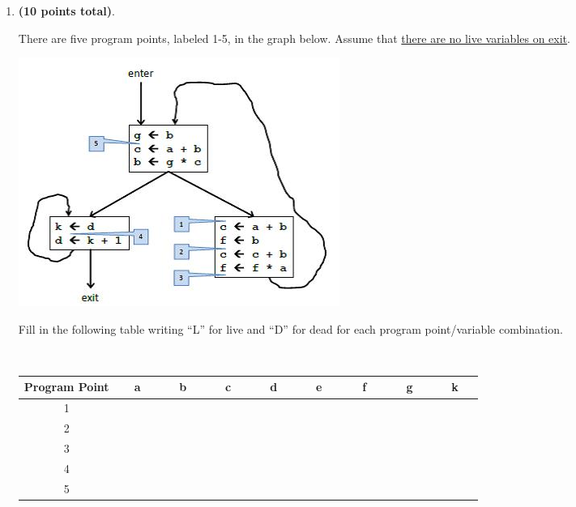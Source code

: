 \documentclass[11pt]{article} %
\begin{document}
\begin{enumerate}
\newpage







\item {\bf{(10 points total)}}.

There are five program points, labeled 1-5, in the graph below. Assume that \underline{there are no live 
variables on exit}. 

\begin{center}
\begin{minipage}{4in}
\includegraphics[]{LivenessFigure}
\end{minipage}
\end{center}


\noindent Fill in the following table writing “L” for live and “D” for dead for each program 
point/variable combination.
\newline

~~~~~~~~~~~~~~~~~~
\begin{tabular}{|c|c|c|c|c|c|c|c|c|}
\hline
Program Point & a & b & c & d & e & f & g & k
\\ \hline
1 &~~~~~~&~~~~~~&~~~~~~&~~~~~~&~~~~~~&~~~~~~&~~~~~~&~~~~~~
\\ \hline
2 &&&&&&&&
\\ \hline
3 &&&&&&&&
\\ \hline
4 &&&&&&&&
\\ \hline
5 &&&&&&&&
\\
\hline
\end{tabular}


\end{enumerate}
\end{document}

